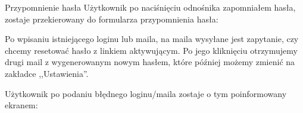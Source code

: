 \begin{userstory}{Przypomnienie hasła}
    Użytkownik po naciśnięciu odnośnika zapomniałem hasła,
    zostaje przekierowany do formularza przypomnienia hasła:
    \begin{tests}
        \item{
            Po wpisaniu istniejącego loginu lub maila, na maila wysyłane jest zapytanie, czy chcemy resetować hasło z linkiem aktywującym. Po jego kliknięciu otrzymujemy drugi mail z wygenerowanym nowym hasłem, które później możemy zmienić na zakładce ,,Ustawienia''.
        }
        \item{
            Użytkownik po podaniu błędnego loginu/maila zostaje o tym poinformowany ekranem:
        }
    \end{tests}
\end{userstory}

